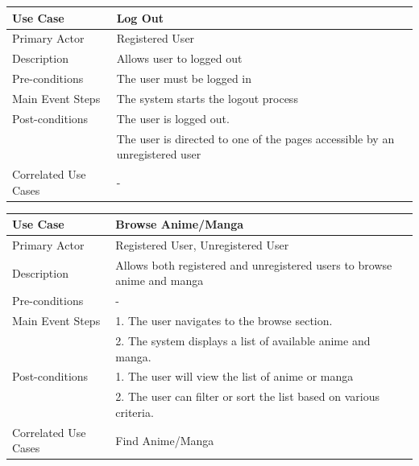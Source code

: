 \begin{longtable}{|p{}|p{}|}
    \hline
    \rowcolor{lightblue}
    \textbf{Use Case} & \textbf{Log Out} \\
    \hline
    Primary Actor &Registered User\\
    \hline
    Description & Allows user to logged out\\
    \hline
    Pre-conditions & The user must be logged in\\
    \hline
    Main Event Steps & The system starts the logout process \\
    \hline
    Post-conditions &The user is logged out. \\
    & The user is directed to one of the pages accessible by an unregistered user \\
    \hline
    Correlated Use Cases &-\\
    \hline
\end{longtable}

\newpage

\begin{longtable}{|p{}|p{}|}
    \hline
    \rowcolor{lightblue}
    \textbf{Use Case} & \textbf{Browse Anime/Manga} \\
    \hline
    Primary Actor & Registered User, Unregistered User\\
    \hline
    Description & Allows both registered and unregistered users to browse anime and manga\\
    \hline
    Pre-conditions & - \\
    \hline
    Main Event Steps & 1. The user navigates to the browse section. \\
    & 2. The system displays a list of available anime and manga. \\
    \hline
    Post-conditions & 1. The user will view the list of anime or manga\\
    & 2. The user can filter or sort the list based on various criteria. \\
    \hline
    Correlated Use Cases & Find Anime/Manga\\
    \hline
\end{longtable}

